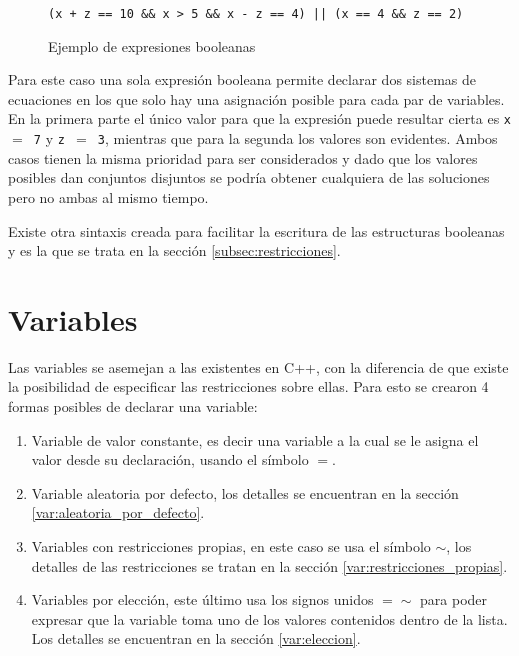 \begin{figure}[h]
\begin{lstlisting}[mathescape]
(x + z == 10 && x > 5 && x - z == 4) || (x == 4 && z == 2)
\end{lstlisting}
\caption[Ejemplos de expresiones booleanas]
{Ejemplo de expresiones booleanas}
\label{ejemplo_expresiones_booleanas}
\end{figure}

Para este caso una sola expresión booleana permite declarar dos sistemas de 
ecuaciones en los que solo hay una asignación posible para cada par de variables. 
En la primera parte el único valor para que la expresión puede resultar cierta es
\texttt{x $=$ 7} y \texttt{z $=$ 3}, mientras que para la segunda los valores son evidentes. Ambos 
casos tienen la misma prioridad para ser considerados y dado que los valores 
posibles dan conjuntos disjuntos se podría obtener cualquiera de las soluciones 
pero no ambas al mismo tiempo.

Existe otra sintaxis creada para facilitar la escritura de las estructuras 
booleanas y es la que se trata en la sección \ref{subsec:restricciones}.

\section{Variables}
\label{def_variables}
Las variables se asemejan a las existentes en C++, con la diferencia de que 
existe la posibilidad de especificar las restricciones sobre ellas. Para esto
se crearon 4 formas posibles de declarar una variable:

\begin{enumerate}
\item {Variable de valor constante, es decir una variable a la cual se le asigna 
  el valor desde su declaración, usando el símbolo \texttt{$=$}.}
\item {Variable aleatoria por defecto, los detalles se encuentran en la sección 
  \ref{var:aleatoria_por_defecto}.}
\item {Variables con restricciones propias, en este caso se usa el símbolo 
  \texttt{$\sim$}, los detalles de las restricciones se tratan en la sección 
  \ref{var:restricciones_propias}.}
\item {Variables por elección, este último usa los signos unidos \texttt{$=\sim$}
  para poder expresar que la variable toma uno de los valores contenidos dentro
  de la lista. Los detalles se encuentran en la sección \ref{var:eleccion}.}
\end{enumerate}

